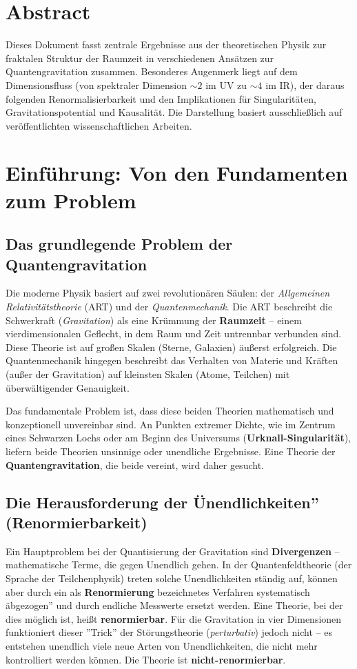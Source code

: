 \section*{Abstract}
		Dieses Dokument fasst zentrale Ergebnisse aus der theoretischen Physik zur fraktalen Struktur der Raumzeit in verschiedenen Ansätzen zur Quantengravitation zusammen. Besonderes Augenmerk liegt auf dem Dimensionsfluss (von spektraler Dimension $\sim 2$ im UV zu $\sim 4$ im IR), der daraus folgenden Renormalisierbarkeit und den Implikationen für Singularitäten, Gravitationspotential und Kausalität. Die Darstellung basiert ausschließlich auf veröffentlichten wissenschaftlichen Arbeiten.

	
	\section{Einführung: Von den Fundamenten zum Problem}
	\subsection{Das grundlegende Problem der Quantengravitation}
	Die moderne Physik basiert auf zwei revolutionären Säulen: der \emph{Allgemeinen Relativitätstheorie} (ART) und der \emph{Quantenmechanik}. Die ART beschreibt die Schwerkraft (\emph{Gravitation}) als eine Krümmung der \textbf{Raumzeit} – einem vierdimensionalen Geflecht, in dem Raum und Zeit untrennbar verbunden sind. Diese Theorie ist auf großen Skalen (Sterne, Galaxien) äußerst erfolgreich. Die Quantenmechanik hingegen beschreibt das Verhalten von Materie und Kräften (außer der Gravitation) auf kleinsten Skalen (Atome, Teilchen) mit überwältigender Genauigkeit.
	
	Das fundamentale Problem ist, dass diese beiden Theorien mathematisch und konzeptionell unvereinbar sind. An Punkten extremer Dichte, wie im Zentrum eines Schwarzen Lochs oder am Beginn des Universums (\textbf{Urknall-Singularität}), liefern beide Theorien unsinnige oder unendliche Ergebnisse. Eine Theorie der \textbf{Quantengravitation}, die beide vereint, wird daher gesucht.
	
	\subsection{Die Herausforderung der Ünendlichkeiten'' (Renormierbarkeit)}
	Ein Hauptproblem bei der Quantisierung der Gravitation sind \textbf{Divergenzen} – mathematische Terme, die gegen Unendlich gehen. In der Quantenfeldtheorie (der Sprache der Teilchenphysik) treten solche Unendlichkeiten ständig auf, können aber durch ein als \textbf{Renormierung} bezeichnetes Verfahren systematisch äbgezogen'' und durch endliche Messwerte ersetzt werden. Eine Theorie, bei der dies möglich ist, heißt \textbf{renormierbar}. Für die Gravitation in vier Dimensionen funktioniert dieser ''Trick'' der Störungstheorie (\emph{perturbativ}) jedoch nicht – es entstehen unendlich viele neue Arten von Unendlichkeiten, die nicht mehr kontrolliert werden können. Die Theorie ist \textbf{nicht-renormierbar}.
	

